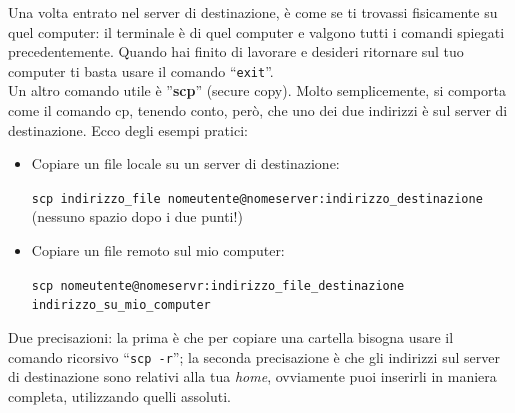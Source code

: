 Una volta entrato nel server di destinazione, è come se ti trovassi fisicamente su quel computer: il terminale è di quel computer e valgono tutti i comandi spiegati precedentemente. Quando hai finito di lavorare e desideri ritornare sul tuo computer ti basta usare il comando ``\verb|exit|''.\\

Un altro comando utile è ''\textbf{scp}'' (secure copy). Molto semplicemente, si comporta come il comando cp, tenendo conto, però, che uno dei due indirizzi è sul server di destinazione. Ecco degli esempi pratici:
\begin{itemize}
	\item Copiare un file locale su un server di destinazione:
	
	\verb|scp indirizzo_file nomeutente@nomeserver:indirizzo_destinazione|
	(nessuno spazio dopo i due punti!)
	\item Copiare un file remoto sul mio computer:
	
	\verb|scp nomeutente@nomeservr:indirizzo_file_destinazione indirizzo_su_mio_computer|
\end{itemize}

Due precisazioni: la prima è che per copiare una cartella bisogna usare il comando ricorsivo ``\verb|scp -r|''; la seconda precisazione è che gli indirizzi sul server di destinazione sono relativi alla tua \emph{home}, ovviamente puoi inserirli in maniera completa, utilizzando quelli assoluti.
